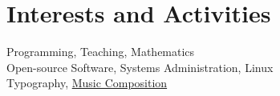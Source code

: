 \documentclass[a4paper,10pt]{article}
\begin{document}

\section{Interests and Activities}
Programming, Teaching, Mathematics\\
Open-source Software, Systems Administration, Linux\\
Typography, \href{https://soundcloud.com/malloc47}{Music Composition}

\end{document}
